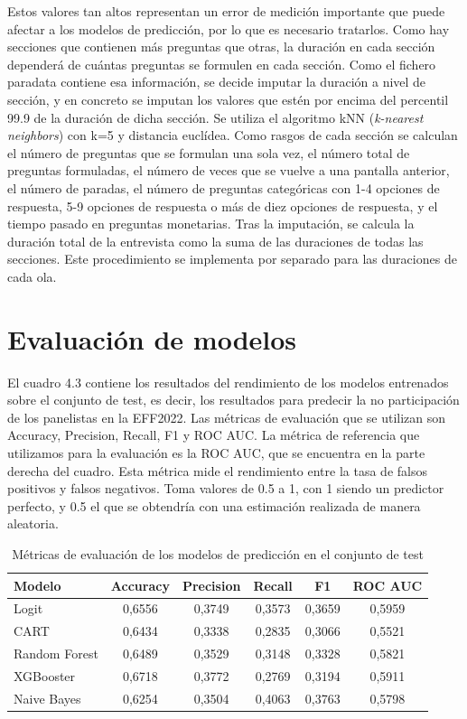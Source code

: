 Estos valores tan altos representan un error de medición importante que puede afectar a los modelos de predicción, por lo que es necesario tratarlos. Como hay secciones que contienen más preguntas que otras, la duración en cada sección dependerá de cuántas preguntas se formulen en cada sección. Como el fichero paradata contiene esa información, se decide imputar la duración a nivel de sección, y en concreto se imputan los valores que estén por encima del percentil 99.9 de la duración de dicha sección. Se utiliza el algoritmo kNN (\textit{k-nearest neighbors}) con k=5 y distancia euclídea. Como rasgos de cada sección se calculan el número de preguntas que se formulan una sola vez, el número total de preguntas formuladas, el número de veces que se vuelve a una pantalla anterior, el número de paradas, el número de preguntas categóricas con 1-4 opciones de respuesta, 5-9 opciones de respuesta o más de diez opciones de respuesta, y el tiempo pasado en preguntas monetarias. Tras la imputación, se calcula la duración total de la entrevista como la suma de las duraciones de todas las secciones. Este procedimiento se implementa por separado para las duraciones de cada ola.

\section{Evaluación de modelos}
\label{section:evaluation_models}

El cuadro 4.3 contiene los resultados del rendimiento de los modelos entrenados sobre el conjunto de test, es decir, los resultados para predecir la no participación de los panelistas en la EFF2022. Las métricas de evaluación que se utilizan son Accuracy, Precision, Recall, F1 y ROC AUC. La métrica de referencia que utilizamos para la evaluación es la ROC AUC, que se encuentra en la parte derecha del cuadro. Esta métrica mide el rendimiento entre la tasa de falsos positivos y falsos negativos. Toma valores de 0.5 a 1, con 1 siendo un predictor perfecto, y 0.5 el que se obtendría con una estimación realizada de manera aleatoria.

\begin{table}[ht]
    \centering
    \begin{tabular}{lccccc}
    \hline
        \textbf{Modelo} & \textbf{Accuracy} & \textbf{Precision} & \textbf{Recall} & \textbf{F1} & \textbf{ROC AUC} \\ \hline
        Logit & 0,6556 & 0,3749 & 0,3573 & 0,3659 & 0,5959 \\ 
        CART & 0,6434 & 0,3338 & 0,2835 & 0,3066 & 0,5521 \\ 
        Random Forest & 0,6489 & 0,3529 & 0,3148 & 0,3328 & 0,5821 \\ 
        XGBooster & 0,6718 & 0,3772 & 0,2769 & 0,3194 & 0,5911 \\ 
        Naive Bayes & 0,6254 & 0,3504 & 0,4063 & 0,3763 & 0,5798 \\ \hline
    \end{tabular}
    \caption{Métricas de evaluación de los modelos de predicción en el conjunto de test}
\end{table}


